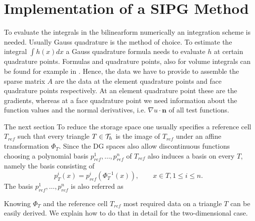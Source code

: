 \section{Implementation of a SIPG Method}
To evaluate the integrals in the bilinearform  numerically an integration scheme is needed. Usually Gauss quadrature is the method of choice. To estimate the integral $\int h(x) dx$ a Gauss quadrature formula needs to evaluate $h$ at certain quadrature points. Formulas and quadrature points, also for volume integrals can be found for example in \cite{Strout1971}.
Hence, the data we have to provide to assemble the sparse matrix $A$ are the data at the element quadrature points and face quadrature points respectively.  
At an element quadrature point these are the gradients, whereas at a face quadrature point we need information about  the function values and the normal derivatives, i.e. $\nabla u \cdot \mathbf{n}$ of all test functions.

The next section 
To reduce the storage space one usually specifies a reference cell $T_{ref}$ such that every triangle $T \in \mathcal{T}_h$ is the image of $T_{ref}$ under an affine transformation $\Phi_T$. 
Since the DG spaces also allow discontinuous functions choosing a polynomial basis $p^1_{ref},\dots,p^n_{ref}$ of $T_{ref}$ also induces a basis on every $T$, namely the basis consisting of 
\[
	p_T^i(x) = p^i_{ref}(\Phi_T^{-1}(x)), \qquad x \in T, 1 \leq i \leq n.
\]
The basis $p^1_{ref},\dots,p^n_{ref}$ is also referred as  

Knowing $\Phi_T$ and the reference cell $T_{ref}$ most required data on a triangle $T$ can be easily derived. We explain how to do that in detail for the two-dimensional case.

